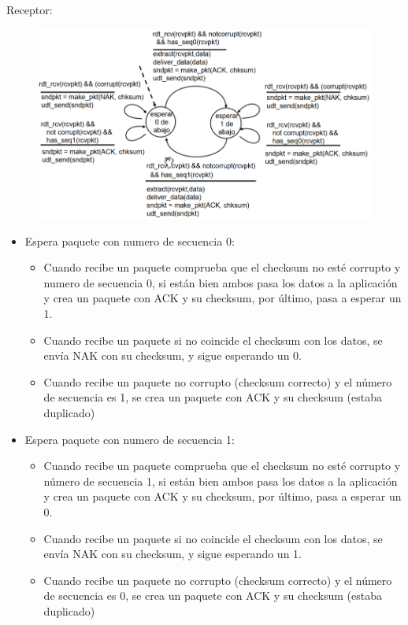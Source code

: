 \documentclass[12pt, twoside, openright]{report} %
\begin{document}
\pagebreak
Receptor:
\begin{figure}[H]
	{\includegraphics[scale=.45]{Untitled 13.png}}
\end{figure}
\begin{itemize}
	\item Espera paquete con numero de secuencia 0:

	      \begin{itemize}
		      \item Cuando recibe un paquete comprueba que el checksum no esté
		            corrupto y numero de secuencia 0, si están bien ambos pasa los
		            datos a la aplicación y crea un paquete con ACK y su checksum,
		            por último, pasa a esperar un 1.
		      \item Cuando recibe un paquete si no coincide el checksum con los
		            datos, se envía NAK con su checksum, y sigue esperando un 0.
		      \item Cuando recibe un paquete no corrupto (checksum correcto) y el
		            número de secuencia es 1, se crea un paquete con ACK y su
		            checksum (estaba duplicado)
	      \end{itemize}
	\item Espera paquete con numero de secuencia 1:

	      \begin{itemize}
		      \item Cuando recibe un paquete comprueba que el checksum no esté
		            corrupto y número de secuencia 1, si están bien ambos pasa los
		            datos a la aplicación y crea un paquete con ACK y su checksum,
		            por último, pasa a esperar un 0.
		      \item Cuando recibe un paquete si no coincide el checksum con los
		            datos, se envía NAK con su checksum, y sigue esperando un 1.
		      \item Cuando recibe un paquete no corrupto (checksum correcto) y el
		            número de secuencia es 0, se crea un paquete con ACK y su
		            checksum (estaba duplicado)
	      \end{itemize}
\end{itemize}
\pagebreak
\end{document}
